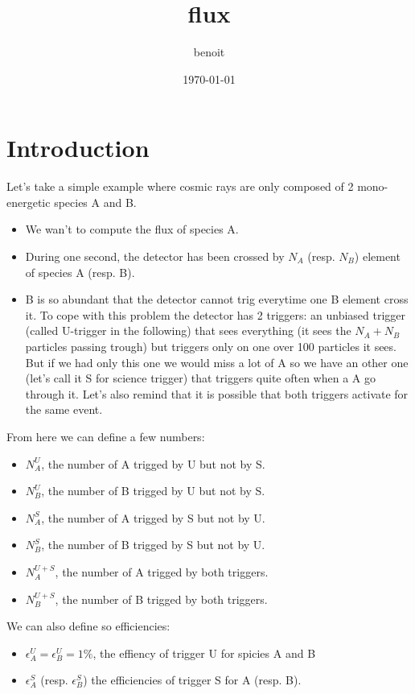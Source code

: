 \documentclass[11pt]{article}
\title{flux}
\author{benoit}
\date{\today}
\begin{document}
\maketitle

\setcounter{tocdepth}{3}
\tableofcontents
\vspace*{1cm}
\section{Introduction}
\label{sec-1}

Let's take a simple example where cosmic rays are only composed of 2 mono-energetic species A and B.
\begin{itemize}
\item We wan't to compute the flux of species A.
\item During one second, the detector has been crossed by $N_{A}$ (resp. $N_{B}$) element of species A (resp. B).
\item B is so abundant that the detector cannot trig everytime one B element cross it. To cope with this problem the detector has 2 triggers:
  an unbiased trigger (called U-trigger in the following) that sees everything (it sees the $N_{A}+N_{B}$ particles passing trough) but triggers only on one over 100 particles it sees. But if we had only this one we would miss a lot of A so we have an other one (let's call it S for science trigger) that triggers quite often when a A go through it. Let's also remind that it is possible that both triggers activate for the same event.
\end{itemize}

From here we can define a few numbers:
\begin{itemize}
\item $N_{A}^{U}$, the number of A trigged by U but not by S.
\item $N_{B}^{U}$, the number of B trigged by U but not by S.
\item $N_{A}^{S}$, the number of A trigged by S but not by U.
\item $N_{B}^{S}$, the number of B trigged by S but not by U.
\item $N_{A}^{U+S}$, the number of A trigged by both triggers.
\item $N_{B}^{U+S}$, the number of B trigged by both triggers.
\end{itemize}

We can also define so efficiencies:
\begin{itemize}
\item $\epsilon_{A}^{U} = \epsilon_{B}^{U} = 1 \%$, the effiency of trigger U for spicies A and B
\item $\epsilon_{A}^{S}$ (resp. $\epsilon_{B}^{S}$) the efficiencies of trigger S for A (resp. B).
\end{itemize}
\end{document}
